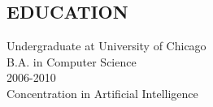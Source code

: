 \documentclass{res}
\begin{document}
 


\address{ 6210 Belcrest Road \\  \#1217 \\ Hyattsville, MD 20782 \\ (609) 948-4264 \\ http://jaibot.com \\ jai@jaibot.com \\ http://github.com/jaibot }

\address{}
                                  
\begin{resume}

\section{EDUCATION}          
    Undergraduate at University of Chicago  \\        
    B.A. in Computer Science   \\   
    2006-2010 \\
    Concentration in Artificial Intelligence      
 

\end{resume}
\end{document}
